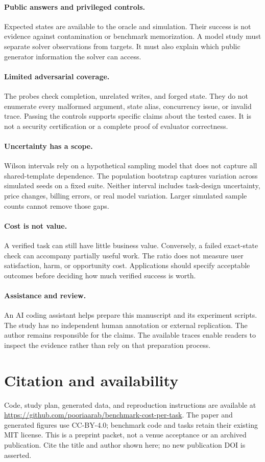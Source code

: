 \documentclass{article}
\begin{document}
\paragraph{Public answers and privileged controls.} Expected states are available to the oracle and simulation. Their success is not evidence against contamination or benchmark memorization. A model study must separate solver observations from targets. It must also explain which public generator information the solver can access.
\paragraph{Limited adversarial coverage.} The probes check completion, unrelated writes, and forged state. They do not enumerate every malformed argument, state alias, concurrency issue, or invalid trace. Passing the controls supports specific claims about the tested cases. It is not a security certification or a complete proof of evaluator correctness.
\paragraph{Uncertainty has a scope.} Wilson intervals rely on a hypothetical sampling model that does not capture all shared-template dependence. The population bootstrap captures variation across simulated seeds on a fixed suite. Neither interval includes task-design uncertainty, price changes, billing errors, or real model variation. Larger simulated sample counts cannot remove those gaps.
\paragraph{Cost is not value.} A verified task can still have little business value. Conversely, a failed exact-state check can accompany partially useful work. The ratio does not measure user satisfaction, harm, or opportunity cost. Applications should specify acceptable outcomes before deciding how much verified success is worth.
\paragraph{Assistance and review.} An AI coding assistant helps prepare this manuscript and its experiment scripts. The study has no independent human annotation or external replication. The author remains responsible for the claims. The available traces enable readers to inspect the evidence rather than rely on that preparation process.
\section{Citation and availability}
Code, study plan, generated data, and reproduction instructions are available at \url{https://github.com/pooriaarab/benchmark-cost-per-task}. The paper and generated figures use CC-BY-4.0; benchmark code and tasks retain their existing MIT license. This is a preprint packet, not a venue acceptance or an archived publication. Cite the title and author shown here; no new publication DOI is asserted.\par
\end{document}
